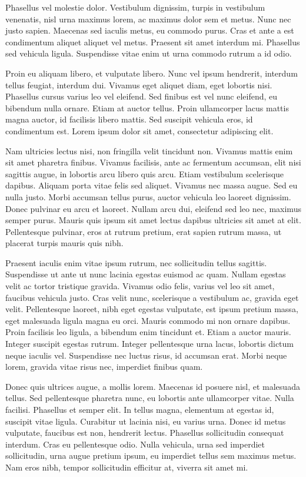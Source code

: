 \documentclass[a4paper,10pt,twoside]{article} %
\begin{document}
Phasellus vel molestie dolor.
Vestibulum dignissim, turpis in vestibulum venenatis, nisl urna maximus lorem, ac maximus dolor sem et metus.
Nunc nec justo sapien.
Maecenas sed iaculis metus, eu commodo purus.
Cras et ante a est condimentum aliquet aliquet vel metus.
Praesent sit amet interdum mi.
Phasellus sed vehicula ligula.
Suspendisse vitae enim ut urna commodo rutrum a id odio.

Proin eu aliquam libero, et vulputate libero.
Nunc vel ipsum hendrerit, interdum tellus feugiat, interdum dui.
Vivamus eget aliquet diam, eget lobortis nisi.
Phasellus cursus varius leo vel eleifend.
Sed finibus est vel nunc eleifend, eu bibendum nulla ornare.
Etiam at auctor tellus.
Proin ullamcorper lacus mattis magna auctor, id facilisis libero mattis.
Sed suscipit vehicula eros, id condimentum est.
Lorem ipsum dolor sit amet, consectetur adipiscing elit.

Nam ultricies lectus nisi, non fringilla velit tincidunt non.
Vivamus mattis enim sit amet pharetra finibus.
Vivamus facilisis, ante ac fermentum accumsan, elit nisi sagittis augue, in lobortis arcu libero quis arcu.
Etiam vestibulum scelerisque dapibus.
Aliquam porta vitae felis sed aliquet.
Vivamus nec massa augue.
Sed eu nulla justo.
Morbi accumsan tellus purus, auctor vehicula leo laoreet dignissim.
Donec pulvinar eu arcu et laoreet.
Nullam arcu dui, eleifend sed leo nec, maximus semper purus.
Mauris quis ipsum sit amet lectus dapibus ultricies sit amet at elit.
Pellentesque pulvinar, eros at rutrum pretium, erat sapien rutrum massa, ut placerat turpis mauris quis nibh.

Praesent iaculis enim vitae ipsum rutrum, nec sollicitudin tellus sagittis.
Suspendisse ut ante ut nunc lacinia egestas euismod ac quam.
Nullam egestas velit ac tortor tristique gravida.
Vivamus odio felis, varius vel leo sit amet, faucibus vehicula justo.
Cras velit nunc, scelerisque a vestibulum ac, gravida eget velit.
Pellentesque laoreet, nibh eget egestas vulputate, est ipsum pretium massa, eget malesuada ligula magna eu orci.
Mauris commodo mi non ornare dapibus.
Proin facilisis leo ligula, a bibendum enim tincidunt et.
Etiam a auctor mauris.
Integer suscipit egestas rutrum.
Integer pellentesque urna lacus, lobortis dictum neque iaculis vel.
Suspendisse nec luctus risus, id accumsan erat.
Morbi neque lorem, gravida vitae risus nec, imperdiet finibus quam.

\startStopMotion[5]
Donec quis ultrices augue, a mollis lorem.
Maecenas id posuere nisl, et malesuada tellus.
Sed pellentesque pharetra nunc, eu lobortis ante ullamcorper vitae.
Nulla facilisi.
Phasellus et semper elit.
In tellus magna, elementum at egestas id, suscipit vitae ligula.
Curabitur ut lacinia nisi, eu varius urna.
Donec id metus vulputate, faucibus est non, hendrerit lectus.
Phasellus sollicitudin consequat interdum.
Cras eu pellentesque odio.
Nulla vehicula, urna sed imperdiet sollicitudin, urna augue pretium ipsum, eu imperdiet tellus sem maximus metus.
Nam eros nibh, tempor sollicitudin efficitur at, viverra sit amet mi.
\end{document}
